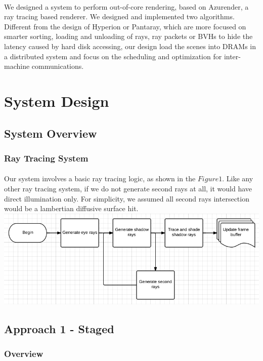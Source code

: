\documentclass[a4paper, oneside, 10pt]{article}
\begin{document}
\paragraph{} We designed a system to perform out-of-core rendering, based on Azurender, a ray tracing based renderer. We designed and implemented two algorithms. Different from the design of Hyperion or Pantaray, which are more focused on smarter sorting, loading and unloading of rays, ray packets or BVHs to hide the latency caused by hard disk accessing, our design load the scenes into DRAMs in a distributed system and focus on the scheduling and optimization for inter-machine communications. 

\section{System Design}
\subsection{System Overview}
\subsubsection{Ray Tracing System}
\paragraph{} Our system involves a basic ray tracing logic, as shown in the $Figure 1$. Like any other ray tracing system, if we do not generate second rays at all, it would have direct illumination only. For simplicity, we assumed all second rays intersection would be a lambertian diffusive surface hit.
\\
\includegraphics[width=\textwidth] {img1}


\subsection{Approach 1 - Staged}
\subsubsection{Overview}
\end{document}
